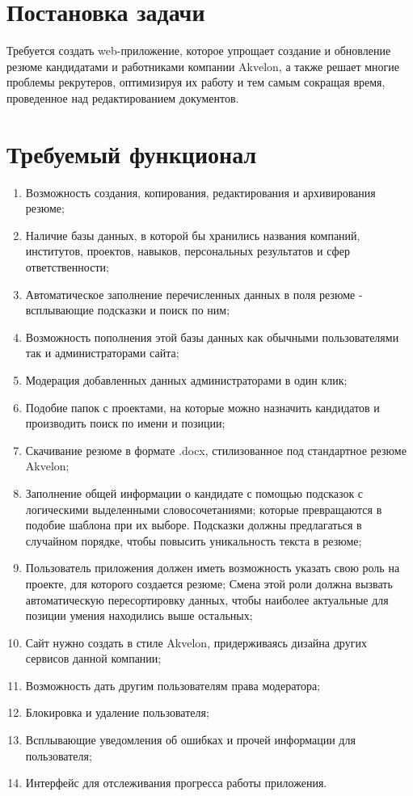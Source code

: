 \documentclass[12pt, a4paper]{diplom}
\begin{document}
\section{Постановка задачи}

Требуется создать web-приложение, которое упрощает создание и обновление резюме кандидатами и работниками компании Akvelon,
а также решает многие проблемы рекрутеров, оптимизируя их работу и тем самым сокращая время,
проведенное над редактированием документов.

\section{Требуемый функционал}

\begin{enumerate}
\item Возможность создания, копирования, редактирования и архивирования резюме;
\item Наличие базы данных, в которой бы хранились названия компаний, институтов,
проектов, навыков, персональных результатов и сфер ответственности;
\item Автоматическое заполнение перечисленных данных в поля резюме - всплывающие подсказки и поиск по ним;
\item Возможность пополнения этой базы данных как обычными пользователями так и администраторами сайта;
\item Модерация добавленных данных администраторами в один клик;
\item Подобие папок с проектами, на которые можно назначить кандидатов и производить поиск по имени и позиции;
\item Скачивание резюме в формате .docx, стилизованное под стандартное резюме Akvelon;
\item Заполнение общей информации о кандидате с помощью подсказок с логическими выделенными словосочетаниями;
которые превращаются в подобие шаблона при их выборе. Подсказки должны предлагаться в случайном порядке, чтобы повысить уникальность текста в резюме;
\item Пользователь приложения должен иметь возможность указать свою роль на проекте, для которого создается резюме;
Смена этой роли должна вызвать автоматическую пересортировку данных,
чтобы наиболее актуальные для позиции умения находились выше остальных;
\item Сайт нужно создать в стиле Akvelon, придерживаясь дизайна других сервисов данной
компании;
\item Возможность дать другим пользователям права модератора;
\item Блокировка и удаление пользователя;
\item Всплывающие уведомления об ошибках и прочей информации для пользователя;
\item Интерфейс для отслеживания прогресса работы приложения.
\end{enumerate}
\end{document}
